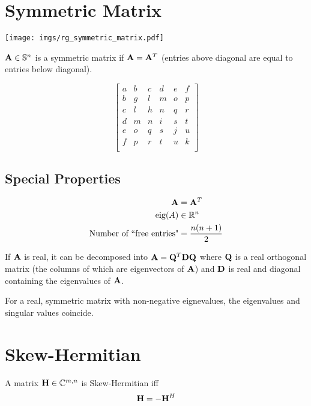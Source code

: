 \section{Symmetric Matrix}

\begin{center}
\texttt{[image: imgs/rg\_symmetric\_matrix.pdf]}
\end{center}

$\mathbf{A}\in\mathbb{S}^{n}$ is a symmetric matrix if $\mathbf{A}=\mathbf{A}^T$ (entries above diagonal are equal to entries below diagonal).

\begin{equation}
\begin{bmatrix}
a & b & c & d & e & f \\
b & g & l & m & o & p \\
c & l & h & n & q & r \\
d & m & n & i & s & t \\
e & o & q & s & j & u \\
f & p & r & t & u & k \\
\end{bmatrix}
\end{equation}


\subsection*{Special Properties}

\begin{align}
\mathbf{A}                                &=   \mathbf{A}^T \\
\operatorname{eig}(A)                            &\in \mathbb{R}^{n}  \\
\textrm{Number of ``free entries"} &=    \frac{n(n+1)}{2}
\end{align}

If $\mathbf{A}$ is real, it can be decomposed into $\mathbf{A}=\mathbf{Q}^T\mathbf{D}\mathbf{Q}$ where $\mathbf{Q}$ is a real orthogonal matrix (the columns of which are eigenvectors of $\mathbf{A}$) and $\mathbf{D}$ is real and diagonal containing the eigenvalues of $\mathbf{A}$.

For a real, symmetric matrix with non-negative eignevalues, the eigenvalues and singular values coincide.



\section{Skew-Hermitian}
A matrix $\mathbf{H}\in\mathbb{C}^{m,n}$ is Skew-Hermitian iff
\begin{equation}
\mathbf{H}=-\mathbf{H}^H
\end{equation}



